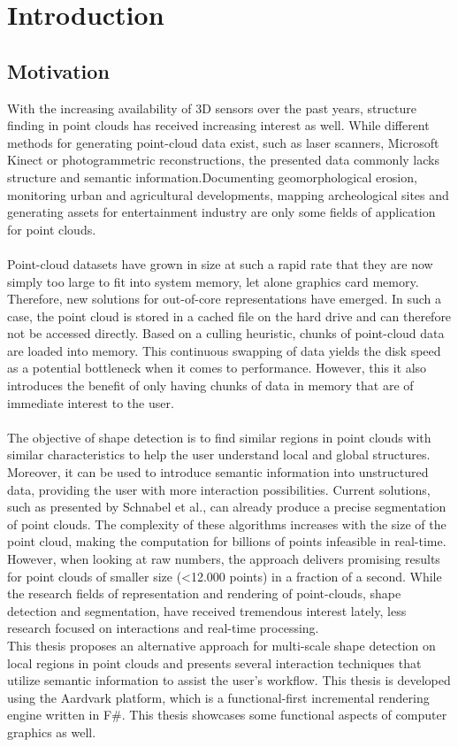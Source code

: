 \chapter{Introduction}
\newpage

\section{Motivation}

With the increasing availability of 3D sensors over the past years, structure finding in point clouds has received increasing interest as well. While different methods for generating point-cloud data exist, such as laser scanners, Microsoft Kinect or photogrammetric reconstructions, the presented data commonly lacks structure and semantic information.Documenting geomorphological erosion, monitoring urban and agricultural developments, mapping archeological sites and generating assets for entertainment industry are only some fields of application for point clouds. 
\\
\\
Point-cloud datasets have grown in size at such a rapid rate that they are now simply too large to fit into system memory, let alone graphics card memory. Therefore, new solutions for out-of-core representations have emerged. In such a case, the point cloud is stored in a cached file on the hard drive and can therefore not be accessed directly. Based on a culling heuristic, chunks of point-cloud data are loaded into memory. This continuous swapping of data yields the disk speed as a potential bottleneck when it comes to performance. However, this it also introduces the benefit of only having chunks of data in memory that are of immediate interest to the user. 
\\
\\
The objective of shape detection is to find similar regions in point clouds with similar characteristics to help the user understand local and global structures. Moreover, it can be used to introduce semantic information into unstructured data, providing the user with more interaction possibilities. Current solutions, such as presented by Schnabel et al.\cite{schnabel-2007-efficient}\cite{schnabel-2007-ransac}, can already produce a precise segmentation of point clouds. The complexity of these algorithms increases with the size of the point cloud, making the computation for billions of points infeasible in real-time. However, when looking at raw numbers, the approach delivers promising results for point clouds of smaller size (<12.000 points) in a fraction of a second.
While the research fields of representation and rendering of point-clouds, shape detection and segmentation, have received tremendous interest lately, less research focused on interactions and real-time processing. 
\\
This thesis proposes an alternative approach for multi-scale shape detection on local regions in point clouds and presents several interaction techniques that utilize semantic information to assist the user's workflow. This thesis is developed using the Aardvark platform, which is a functional-first incremental rendering engine written in F\#. This thesis showcases some functional aspects of computer graphics as well. 


